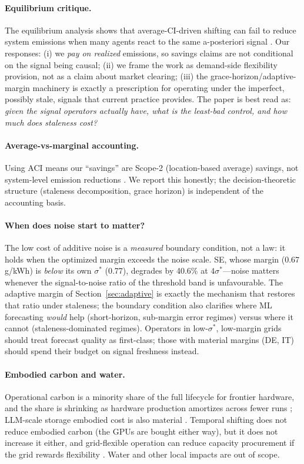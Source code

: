 \documentclass[sigconf,nonacm=false]{acmart}
\begin{document}
\paragraph{Equilibrium critique.}
The equilibrium analysis shows that average-CI-driven shifting can fail to
reduce system emissions when many agents react to the same a-posteriori signal
\cite{jiang2026equilibrium}. Our responses: (i) we \emph{pay on realized}
emissions, so savings claims are not conditional on the signal being causal;
(ii) we frame the work as demand-side flexibility provision, not as a claim
about market clearing; (iii) the grace-horizon/adaptive-margin machinery is
exactly a prescription for operating under the imperfect, possibly stale,
signals that current practice provides. The paper is best read as: \emph{given
the signal operators actually have, what is the least-bad control, and how much
does staleness cost?}

\paragraph{Average-vs-marginal accounting.}
Using ACI means our ``savings'' are Scope-2 (location-based average) savings,
not system-level emission reductions \cite{sukprasert2024avm}. We report this
honestly; the decision-theoretic structure (staleness decomposition, grace
horizon) is independent of the accounting basis.

\paragraph{When does noise start to matter?}
The low cost of additive noise is a \emph{measured} boundary condition, not a
law: it
holds when the optimized margin exceeds the noise scale. SE, whose margin
(0.67\,g/kWh) is \emph{below} its own $\sigma^*$ (0.77), degrades by 40.6\% at
$4\sigma^*$---noise matters whenever the signal-to-noise ratio of the
threshold band is unfavourable. The adaptive margin of
Section~\ref{sec:adaptive} is exactly the mechanism that restores that ratio
under staleness; the boundary condition also clarifies where ML forecasting
\emph{would} help (short-horizon, sub-margin error regimes) versus where it
cannot (staleness-dominated regimes). Operators in low-$\sigma^*$, low-margin
grids should treat forecast quality as first-class; those with material margins
(DE, IT) should spend their budget on signal freshness instead.

\paragraph{Embodied carbon and water.}
Operational carbon is a minority share of the full lifecycle for frontier
hardware, and the share is shrinking as hardware production amortizes across
fewer runs \cite{schneider2025lifecycle,luccioni2022bloom}; LLM-scale storage
embodied cost is also material \cite{tian2025greencache}. Temporal shifting
does not reduce embodied carbon (the GPUs are bought either way), but it does
not increase it either, and grid-flexible operation can reduce capacity
procurement if the grid rewards flexibility \cite{acun2023carbonexplorer}. Water
and other local impacts are out of scope.
\end{document}
